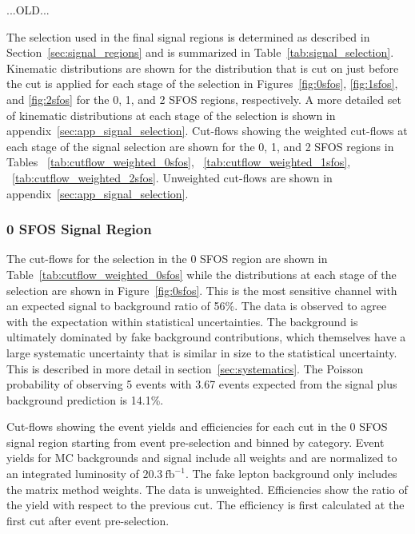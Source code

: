 ...OLD...

The selection used in the final signal regions is determined as described in Section~\ref{sec:signal_regions} and is summarized in Table~\ref{tab:signal_selection}. Kinematic distributions are shown for the distribution
that is cut on just before the cut is applied
for each stage of the selection in Figures~\ref{fig:0sfos}, \ref{fig:1sfos}, and \ref{fig:2sfos} for
the 0, 1, and 2 SFOS regions, respectively.
A more detailed set of kinematic distributions at each stage of the selection is 
shown in appendix~\ref{sec:app_signal_selection}. 
Cut-flows showing the weighted cut-flows at each stage of the signal selection are shown for the 0, 1, and 2 SFOS regions
in Tables ~\ref{tab:cutflow_weighted_0sfos}, ~\ref{tab:cutflow_weighted_1sfos}, ~\ref{tab:cutflow_weighted_2sfos}.
Unweighted cut-flows are shown in appendix~\ref{sec:app_signal_selection}.





\subsubsection{0 SFOS Signal Region}

The cut-flows for the selection in the 0 SFOS region are shown in Table~\ref{tab:cutflow_weighted_0sfos}
while the distributions at each stage of the selection are shown in Figure~\ref{fig:0sfos}.
This is the most sensitive channel with an expected signal to background ratio of 56\%.
The data is observed to agree with the expectation within statistical uncertainties. The background
is ultimately dominated by fake background contributions, which themselves have a large systematic uncertainty
that is similar in size to the statistical uncertainty. This is described in more detail in section~\ref{sec:systematics}.
The Poisson probability of observing 5 events with 3.67 events expected from the signal plus background prediction is 14.1\%.


\begin{table}[ht!]
\centering
\scriptsize

\caption{Cut-flows showing the event yields and efficiencies for each cut in the 0 SFOS signal region
starting from event pre-selection and binned by category. 
Event yields for MC backgrounds and signal include all weights and are normalized to an integrated luminosity of $20.3~\mathrm{fb}^{-1}$.  
The fake lepton background only includes the matrix method weights.  The data is unweighted.
Efficiencies show the ratio of the yield with respect
to the previous cut.  The efficiency is first calculated at the first cut after event pre-selection.  }
\label{tab:cutflow_weighted_0sfos}
\end{table}



